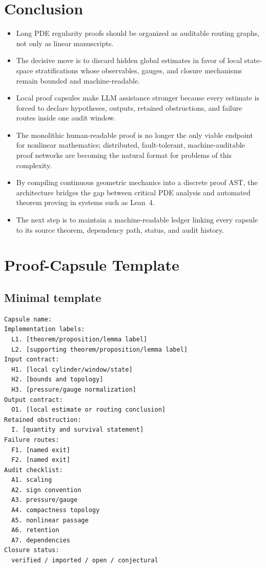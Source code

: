 \documentclass[11pt]{article}
\theoremstyle{plain}
\theoremstyle{definition}
\theoremstyle{remark}
\begin{document}
\section{Conclusion}
\label{sec:conclusion}

\begin{itemize}
  \item Long PDE regularity proofs should be organized as auditable routing graphs, not only as linear manuscripts.
  \item The decisive move is to discard hidden global estimates in favor of local state-space stratifications whose observables, gauges, and closure mechanisms remain bounded and machine-readable.
  \item Local proof capsules make LLM assistance stronger because every estimate is forced to declare hypotheses, outputs, retained obstructions, and failure routes inside one audit window.
  \item The monolithic human-readable proof is no longer the only viable endpoint for nonlinear mathematics; distributed, fault-tolerant, machine-auditable proof networks are becoming the natural format for problems of this complexity.
  \item By compiling continuous geometric mechanics into a discrete proof AST, the architecture bridges the gap between critical PDE analysis and automated theorem proving in systems such as Lean~4.
  \item The next step is to maintain a machine-readable ledger linking every capsule to its source theorem, dependency path, status, and audit history.
\end{itemize}

\appendix

\section{Proof-Capsule Template}
\label{app:capsule-template}

\subsection{Minimal template}
\begin{lstlisting}
Capsule name:
Implementation labels:
  L1. [theorem/proposition/lemma label]
  L2. [supporting theorem/proposition/lemma label]
Input contract:
  H1. [local cylinder/window/state]
  H2. [bounds and topology]
  H3. [pressure/gauge normalization]
Output contract:
  O1. [local estimate or routing conclusion]
Retained obstruction:
  I. [quantity and survival statement]
Failure routes:
  F1. [named exit]
  F2. [named exit]
Audit checklist:
  A1. scaling
  A2. sign convention
  A3. pressure/gauge
  A4. compactness topology
  A5. nonlinear passage
  A6. retention
  A7. dependencies
Closure status:
  verified / imported / open / conjectural
\end{lstlisting}
\end{document}
